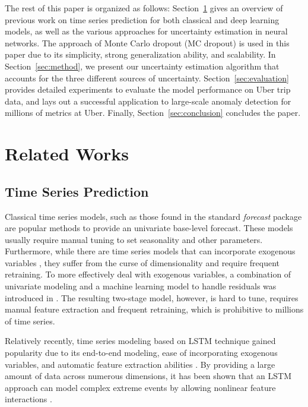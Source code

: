 \documentclass[conference,compsoc,final]{IEEEtran}
\begin{document}
The rest of this paper is organized as follows: Section~\ref{sec:related} gives an overview of previous work on time series prediction for both classical and deep learning models, as well as the various approaches for uncertainty estimation in neural networks. The approach of Monte Carlo dropout (MC dropout) is used in this paper due to its simplicity,  strong generalization ability, and scalability. In Section~\ref{sec:method}, we present our uncertainty estimation algorithm that accounts for the three different sources of uncertainty. Section~\ref{sec:evaluation} provides detailed experiments to evaluate the model performance on 
Uber trip data,
and lays out a successful application to large-scale anomaly detection for millions of metrics at Uber. 
Finally, Section~\ref{sec:conclusion} concludes the paper.




 

\section{Related Works}
\label{sec:related}

\subsection{Time Series Prediction}

Classical time series models, such as those found in the standard  \textit{forecast}\cite{forecast} package are popular methods to provide an univariate base-level forecast. These models usually require manual tuning to set seasonality and other parameters. Furthermore, while there are time series models that can incorporate exogenous variables \cite{wei1994time}, they suffer from the curse of dimensionality and require frequent retraining. To more effectively deal with exogenous variables, a combination of univariate modeling and a machine learning model to handle residuals was introduced in \cite{2015arXiv150702537O}. The resulting two-stage model, however, is hard to tune, requires manual feature extraction and frequent retraining, which is prohibitive to millions of time series. 

Relatively recently, time series modeling based on LSTM \cite{Hochreiter:1997:LSM:1246443.1246450} technique gained popularity due to its end-to-end modeling, ease of incorporating exogenous variables, and automatic feature extraction abilities \cite{Assaad:2008:NBA:1297420.1297576}. By providing a large amount of data across numerous dimensions, it has been shown that an LSTM approach can model complex extreme events by allowing nonlinear feature interactions \cite{DBLP:journals/corr/OgunmoluGJG16, laptev:2017:1273496}.
\end{document}
